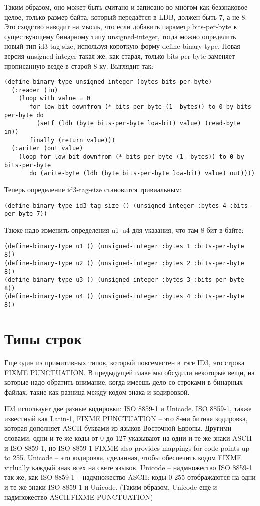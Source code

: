 Таким образом, оно может быть считано и записано во многом как беззнаковое целое, только
размер байта, который передаётся в LDB, должен быть 7, а не 8.  Это сходство наводит на
мысль, что если добавить параметр bits-per-byte к существующему бинарному типу
unsigned-integer, тогда можно определить новый тип id3-tag-size, используя короткую форму
define-binary-type.  Новая версия unsigned-integer такая же, как старая, только
bits-per-byte заменяет прописанную везде в старой 8-ку.  Выглядит так:

\begin{lstlisting}
(define-binary-type unsigned-integer (bytes bits-per-byte)
  (:reader (in)
    (loop with value = 0
       for low-bit downfrom (* bits-per-byte (1- bytes)) to 0 by bits-per-byte do
         (setf (ldb (byte bits-per-byte low-bit) value) (read-byte in))
       finally (return value)))
  (:writer (out value)
    (loop for low-bit downfrom (* bits-per-byte (1- bytes)) to 0 by bits-per-byte
       do (write-byte (ldb (byte bits-per-byte low-bit) value) out))))
\end{lstlisting}

Теперь определение id3-tag-size становится тривиальным:

\begin{lstlisting}
(define-binary-type id3-tag-size () (unsigned-integer :bytes 4 :bits-per-byte 7))
\end{lstlisting}

Также надо изменить определения u1--u4 для указания, что там 8 бит в байте:

\begin{lstlisting}
(define-binary-type u1 () (unsigned-integer :bytes 1 :bits-per-byte 8))
(define-binary-type u2 () (unsigned-integer :bytes 2 :bits-per-byte 8))
(define-binary-type u3 () (unsigned-integer :bytes 3 :bits-per-byte 8))
(define-binary-type u4 () (unsigned-integer :bytes 4 :bits-per-byte 8))
\end{lstlisting}

\section{Типы строк}

Еще один из примитивных типов, который повсеместен в тэге ID3, это строка FIXME
PUNCTUATION.  В предыдущей главе мы обсудили некоторые вещи, на которые надо обратить
внимание, когда имеешь дело со строками в бинарных файлах, такие как разница между кодом
знака и кодировкой.

ID3 использует две разные кодировки: ISO 8859-1 и Unicode. ISO 8859-1, также известный как
Latin-1, FIXME PUNCTUATION -- это 8-ми битная кодировка, которая дополняет ASCII буквами
из языков Восточной Европы.  Другими словами, одни и те же коды от 0 до 127 указывают на
одни и те же знаки ASCII и ISO 8859-1, но ISO 8859-1 FIXME also provides mappings for code
points up to 255.  Unicode -- это кодировка, сделанная, чтобы обеспечить кодом FIXME
virlually каждый знак всех на свете языков.  Unicode -- надмножество ISO 8859-1 так же,
как ISO 8859-1 -- надмножество ASCII: коды 0-255 отображаются на одни и те же знаки ISO
8859-1 и Unicode. (Таким образом, Unicode ещё и надмножество ASCII.FIXME PUNCTUATION)

